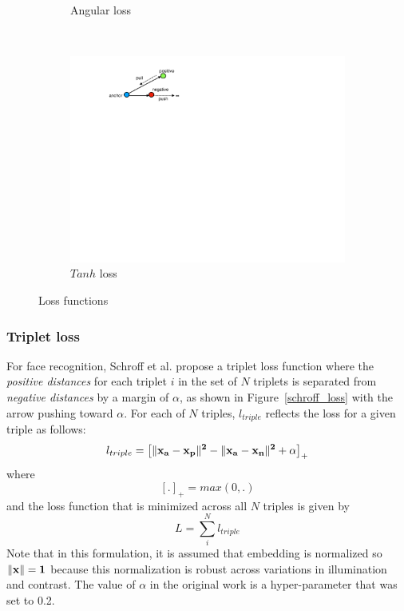 \begin{figure}[htb]
\begin{subfigure}[t]{0.23\textwidth}
        \caption{Angular loss}
        \label{angular_loss}
    \end{subfigure}
    ~ 
    \begin{subfigure}[t]{0.23\textwidth}
        \centering 
        \includegraphics[width=.9\linewidth]{tanh_triplet}
        \caption{$Tanh$ loss}
        \label{tanh_loss}
    \end{subfigure}
    \caption{Loss functions}
\end{figure}

\subsubsection{Triplet loss}

For face recognition, Schroff et al. \cite{DBLP:conf/cvpr/SchroffKP15}
propose a triplet loss function where the \textit{positive distances}
for each triplet $i$ in the set of $N$ triplets is separated from
\textit{negative distances} by a margin of $\alpha$, as shown in
Figure~\ref{schroff_loss} with the arrow pushing toward $\alpha$.  For
each of $N$ triples, $l_{triple}$ reflects the loss for a given triple
as follows: 
\begin{equation}
  l_{triple} =  \left[\|\bf{x_a} - \bf{x_p}\|^2 - \|\bf{x_a} -\bf{x_n}\|^2 + \alpha \right]_+
\label{schroff}
\end{equation}
where
\begin{equation}
 \left[.\right]_{+} = max(0, .)
\end{equation}
and the loss function that is minimized across all $N$ triples is given by
\begin{equation}
 L = \sum_{i}^{N} l_{triple}
\end{equation}
Note that in this formulation, it is assumed that embedding is normalized so $\|\bf{x} \| = 1$ because this normalization is robust across variations in illumination and contrast.  The value of $\alpha$ in the original work is a hyper-parameter that \cite{DBLP:conf/cvpr/SchroffKP15} was set to 0.2.

